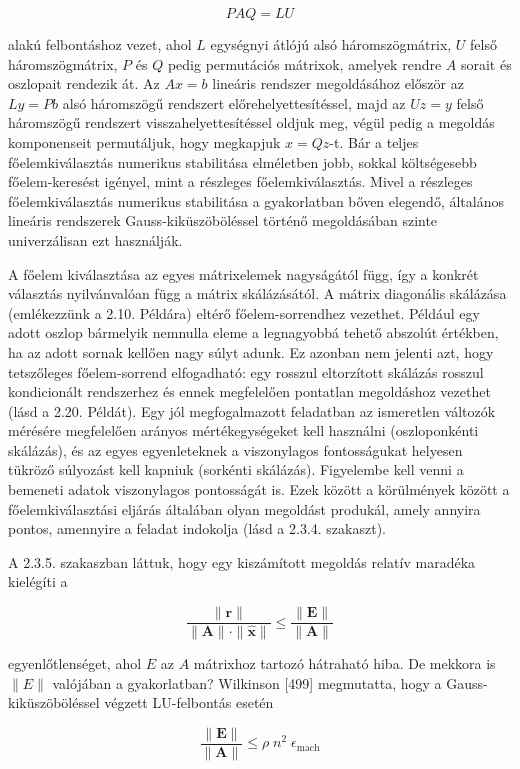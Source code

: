 \documentclass[
  magyar,
  11pt]{article}
\providecommand{\boldsymbol}[1]{\mathbf{#1}}
\begin{document}
\[PAQ = LU\]

alakú felbontáshoz vezet, ahol \(L\) egységnyi átlójú alsó
háromszögmátrix, \(U\) felső háromszögmátrix, \(P\) és \(Q\) pedig
permutációs mátrixok, amelyek rendre \(A\) sorait és oszlopait rendezik
át. Az \(Ax = b\) lineáris rendszer megoldásához először az \(Ly = Pb\)
alsó háromszögű rendszert előrehelyettesítéssel, majd az \(Uz = y\)
felső háromszögű rendszert visszahelyettesítéssel oldjuk meg, végül
pedig a megoldás komponenseit permutáljuk, hogy megkapjuk \(x = Qz\)-t.
Bár a teljes főelemkiválasztás numerikus stabilitása elméletben jobb,
sokkal költségesebb főelem-keresést igényel, mint a részleges
főelemkiválasztás. Mivel a részleges főelemkiválasztás numerikus
stabilitása a gyakorlatban bőven elegendő, általános lineáris rendszerek
Gauss-kiküszöböléssel történő megoldásában szinte univerzálisan ezt
használják.

A főelem kiválasztása az egyes mátrixelemek nagyságától függ, így a
konkrét választás nyilvánvalóan függ a mátrix skálázásától. A mátrix
diagonális skálázása (emlékezzünk a 2.10. Példára) eltérő
főelem-sorrendhez vezethet. Például egy adott oszlop bármelyik nemnulla
eleme a legnagyobbá tehető abszolút értékben, ha az adott sornak kellően
nagy súlyt adunk. Ez azonban nem jelenti azt, hogy tetszőleges
főelem-sorrend elfogadható: egy rosszul eltorzított skálázás rosszul
kondicionált rendszerhez és ennek megfelelően pontatlan megoldáshoz
vezethet (lásd a 2.20. Példát). Egy jól megfogalmazott feladatban az
ismeretlen változók mérésére megfelelően arányos mértékegységeket kell
használni (oszloponkénti skálázás), és az egyes egyenleteknek a
viszonylagos fontosságukat helyesen tükröző súlyozást kell kapniuk
(sorkénti skálázás). Figyelembe kell venni a bemeneti adatok
viszonylagos pontosságát is. Ezek között a körülmények között a
főelemkiválasztási eljárás általában olyan megoldást produkál, amely
annyira pontos, amennyire a feladat indokolja (lásd a 2.3.4. szakaszt).

A 2.3.5. szakaszban láttuk, hogy egy kiszámított megoldás relatív
maradéka kielégíti a

\[\frac{\|\boldsymbol{r}\|}{\|\boldsymbol{A}\|\cdot\|\hat{\boldsymbol{x}}\|} \leq \frac{\|\boldsymbol{E}\|}{\|\boldsymbol{A}\|}\]

egyenlőtlenséget, ahol \(E\) az \(A\) mátrixhoz tartozó hátraható hiba.
De mekkora is \(\|E\|\) valójában a gyakorlatban? Wilkinson {[}499{]}
megmutatta, hogy a Gauss-kiküszöböléssel végzett LU-felbontás esetén

\[\frac{\|\boldsymbol{E}\|}{\|\boldsymbol{A}\|} \le \rho \; n^2 \; \epsilon_{\text{mach}}\]
\end{document}
